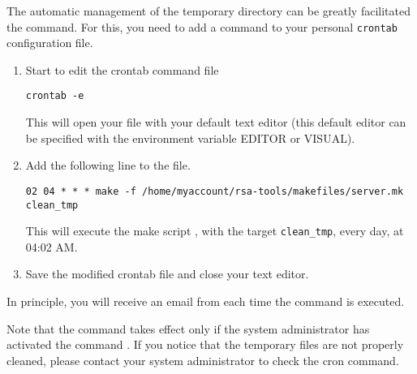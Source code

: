 \documentclass{article}
\begin{document}
The automatic management of the temporary directory can be greatly
facilitated the  command. For this, you need to add a
command to your personal \texttt{crontab} configuration file.

\begin{enumerate}
\item Start to edit the crontab command file

\begin{verbatim}
crontab -e
\end{verbatim}

This will open your  file with your default text editor
(this default editor can be specified with the environment variable
EDITOR or VISUAL).

\item Add the following line to the  file. 

\begin{verbatim}
02 04 * * * make -f /home/myaccount/rsa-tools/makefiles/server.mk clean_tmp
\end{verbatim}

This will execute the make script , with the target
\texttt{clean\_tmp}, every day, at 04:02 AM. 

\item Save the modified crontab file and close your text editor.

\end{enumerate}

In principle, you will receive an email from  each
time the command is executed.

Note that the command  takes effect only if the
system administrator has activated the command . If you
notice that the temporary files are not properly cleaned, please
contact your system administrator to check the cron command.
\end{document}
